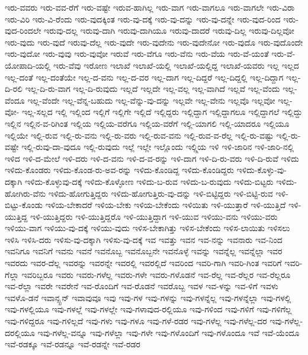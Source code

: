 {ಇರು-ವವರು
ಇರು-ವವ-ರೆಗೆ
ಇರು-ವಷ್ಟೇ
ಇರುವ-ಹಾಗಿಲ್ಲ
ಇರು-ವಾಗ
ಇರು-ವಾಗಲೂ
ಇರು-ವಾಗಲೇ
ಇರು-ವಿರಾ
ಇರು-ವಿರಿ
ಇರು-ವಿ-ರೆಂದು
ಇರು-ವುದಕ್ಕಿಂತ
ಇರು-ವು-ದಕ್ಕೆ
ಇರು-ವು-ದನ್ನು
ಇರು-ವು-ದನ್ನೇ
ಇರು-ವುದ-ರಿಂದ
ಇರು-ವುದ-ರಿಂದಲೇ
ಇರುವು-ದಲ್ಲ
ಇರುವು-ದಾಗಿ
ಇರುವು-ದಾಗಿಯೂ
ಇರುವು-ದಾದರೆ
ಇರುವು-ದಿಲ್ಲ
ಇರುವು-ದಿಲ್ಲವೋ
ಇರು-ವುದು
ಇರು-ವುದೆ
ಇರುವು-ದೆಲ್ಲ
ಇರು-ವುದೇ
ಇರು-ವುದೇನು
ಇರು-ವುದೇನೋ
ಇರು-ವುದೊ
ಇರು-ವುದೊಂದೇ
ಇರು-ವುದೋ
ಇರು-ವುವು
ಇರು-ವುವೋ
ಇರುವೆ
ಇರು-ವೆಗೂ
ಇರು-ವೆನು
ಇರು-ವೆಯ
ಇರು-ವೆ-ಯಂತೆ
ಇರು-ವೆ-ಯೋಪಾದಿ-ಯಲ್ಲಿ
ಇರು-ವೆವು
ಇರೋಣ
ಇಲಾಖೆ
ಇಲಾಖೆ-ಯಲ್ಲಿ
ಇಲಾಖೆ-ಯಲ್ಲಿದ್ದ
ಇಲಾಖೆ-ಯವರು
ಇಲ್ಲ
ಇಲ್ಲದ
ಇಲ್ಲ-ದಂತೆ
ಇಲ್ಲ-ದಂತೆಯೇ
ಇಲ್ಲ-ದ-ವನು
ಇಲ್ಲ-ದ-ವರ
ಇಲ್ಲ-ದಾಗ
ಇಲ್ಲ-ದಿದ್ದರೆ
ಇಲ್ಲ-ದಿದ್ದಲ್ಲಿ
ಇಲ್ಲ-ದಿದ್ದಾಗ
ಇಲ್ಲ-ದಿ-ರಲಿ
ಇಲ್ಲ-ದಿ-ರು-ವಾಗ
ಇಲ್ಲ-ದಿ-ರುವುದು
ಇಲ್ಲದೆ
ಇಲ್ಲದೇ
ಇಲ್ಲ-ವಲ್ಲ
ಇಲ್ಲ-ವಾಗಿದೆ
ಇಲ್ಲವೆ
ಇಲ್ಲ-ವೆಂದು
ಇಲ್ಲ-ವೆಂದೂ
ಇಲ್ಲ-ವೆಂದೇ
ಇಲ್ಲ-ವೆನ್ನ-ಬಹುದು
ಇಲ್ಲ-ವೆನ್ನು-ವು-ದನ್ನು
ಇಲ್ಲವೇ
ಇಲ್ಲ-ವೇನು
ಇಲ್ಲವೊ
ಇಲ್ಲವೋ
ಇಲ್ಲ-ವೋ-
ಇಲ್ಲ-ಸಲ್ಲದ
ಇಲ್ಲಿ
ಇಲ್ಲಿಂದ
ಇಲ್ಲಿಗೆ
ಇಲ್ಲಿಗೇ
ಇಲ್ಲಿದೆ
ಇಲ್ಲಿದ್ದರು
ಇಲ್ಲಿದ್ದಾಗ
ಇಲ್ಲಿದ್ದಾಗಲೂ
ಇಲ್ಲಿದ್ದಾಗಲೆ
ಇಲ್ಲಿದ್ದು
ಇಲ್ಲಿನ
ಇಲ್ಲಿನ-ವ-ರಿಗಿಂತ
ಇಲ್ಲಿಯ
ಇಲ್ಲಿಯ-ವರೆಗೂ
ಇಲ್ಲಿಯ-ವರೆಗೆ
ಇಲ್ಲಿ-ಯಾಗಲಿ
ಇಲ್ಲಿ-ಯಾದರೂ
ಇಲ್ಲಿಯೂ
ಇಲ್ಲಿಯೇ
ಇಲ್ಲಿ-ರುವ
ಇಲ್ಲಿ-ರು-ವನು
ಇಲ್ಲಿ-ರು-ವರು
ಇಲ್ಲಿ-ರುವ-ವನು
ಇಲ್ಲಿ-ರುವ-ವ-ರೆಲ್ಲ
ಇಲ್ಲಿ-ರು-ವಷ್ಟು
ಇಲ್ಲಿ-ರು-ವಷ್ಟೇ
ಇಲ್ಲಿ-ರುವು-ದಾ-ವುದೂ
ಇಲ್ಲಿ-ರುವುದು
ಇಲ್ಲೆ
ಇಲ್ಲೇ
ಇಲ್ಲೊಂದು
ಇಲ್ಲ್ಲಿಯ
ಇಳಿ
ಇಳಿ-ಜಾರಿನ
ಇಳಿ-ಜಾರಿ-ನಲ್ಲಿ
ಇಳಿದ
ಇಳಿ-ದ-ಮೇಲೆ
ಇಳಿ-ದರು
ಇಳಿ-ದ-ವನು
ಇಳಿ-ದ-ವ-ರನ್ನು
ಇಳಿ-ದಾಗ
ಇಳಿ-ದಿ-ರು-ವರು
ಇಳಿ-ದಿ-ರುವೆ
ಇಳಿದು
ಇಳಿದು-ಕೊಂಡರು
ಇಳಿದು-ಕೊಂಡ-ರು-ಅವ-ರನ್ನು
ಇಳಿದು-ಕೊಂಡಿದ್ದ
ಇಳಿದು-ಕೊಂಡಿದ್ದರು
ಇಳಿದು-ಕೊಳ್ಳು-ವು-ದಕ್ಕಾಗಿ
ಇಳಿದು-ಕೊಳ್ಳುವು-ದಕ್ಕೆ
ಇಳಿದು-ಕೊಳ್ಳೋಣ
ಇಳಿದು-ಬ-ರುವ
ಇಳಿದು-ಬ-ರುವುದು
ಇಳಿದು-ಬಿಟ್ಟರು
ಇಳಿದು-ಹೋಗಿರು-ವೆನು
ಇಳಿದು-ಹೋಗುತ್ತಿದ್ದರು
ಇಳಿದು-ಹೋಗುತ್ತಿರು-ವು-ದನ್ನು
ಇಳಿ-ಬಿಟ್ಟಿದ್ದರು
ಇಳಿ-ಬಿಟ್ಟಿ-ರುವ
ಇಳಿ-ಬಿಟ್ಟು-ಕೊಂಡು
ಇಳಿಯ-ಬೇಕಾದರೆ
ಇಳಿಯ-ಬೇಕು
ಇಳಿಯ-ಬೇಕೆಂದು
ಇಳಿಯಿತು
ಇಳಿ-ಯುತ್ತಾರೆ
ಇಳಿ-ಯುತ್ತಿದೆ
ಇಳಿ-ಯುತ್ತಿದ್ದ
ಇಳಿ-ಯುತ್ತಿದ್ದರು
ಇಳಿ-ಯುತ್ತಿದ್ದರೊ
ಇಳಿ-ಯುತ್ತಿದ್ದಾಗ
ಇಳಿ-ಯುವ
ಇಳಿಯು-ವನು
ಇಳಿಯು-ವರು
ಇಳಿಯು-ವಾಗ
ಇಳಿಯು-ವು-ದಕ್ಕೆ
ಇಳಿಯು-ವುದು
ಇಳಿಸ-ಬೇಕಾಗಿತ್ತು
ಇಳಿಸ-ಬೇಕೆಂದು
ಇಳಿಸ-ಲಾಯಿತು
ಇಳಿಸಲು
ಇಳಿಸಿ
ಇಳಿಸಿ-ದರು
ಇಳಿಸು-ವು-ದಕ್ಕಾಗಿ
ಇಳಿಸು-ವು-ದಕ್ಕೆ
ಇವ
ಇವತ್ತು
ಇವನ
ಇವ-ನನ್ನು
ಇವನಾರು
ಇವ-ನಿಂದ
ಇವನಿಗೂ
ಇವನಿಗೆ
ಇವನು
ಇವನೆ
ಇವನೊಬ್ಬ
ಇವನೊಬ್ಬನೇ
ಇವನೊಳ್ಳೆ
ಇವನ್ನು
ಇವನ್ನೆಲ್ಲ
ಇವನ್ನೆಲ್ಲಾ
ಇವರ
ಇವರದು
ಇವರ-ದೆಲ್ಲ
ಇವರನ್ನು
ಇವರನ್ನೇ
ಇವರಲ್ಲಿ
ಇವರಲ್ಲಿದೆ
ಇವರಿಂದ
ಇವರಿ-ಗಾಗಿ
ಇವರಿ-ಗಿಂತ
ಇವರಿಗೆ
ಇವರಿ-ಗೆಲ್ಲಾ
ಇವರಿಬ್ಬರೂ
ಇವರು
ಇವರು-ಗಳೆಲ್ಲ
ಇವರು-ಗಳೇ
ಇವರು-ಗಳೊಡನೆ
ಇವ-ರೆಲ್ಲ
ಇವ-ರೆಲ್ಲರ
ಇವ-ರೆಲ್ಲರೂ
ಇವ-ರೆಲ್ಲಾ
ಇವರೇ
ಇವರೇನೆ
ಇವ-ರೊಂದಿಗೆ
ಇವ-ರೊಡನೆ
ಇವರೊಬ್ಬ
ಇವಳ
ಇವ-ಳನ್ನು
ಇವ-ಳಿಗೆ
ಇವಳು
ಇವಳೊ-ಡನೆ
ಇವಾನ್ಸ್ಟನ್
ಇವಾವುವೂ
ಇವು
ಇವು-ಗಳ
ಇವು-ಗಳನ್ನು
ಇವು-ಗಳನ್ನೆಲ್ಲ
ಇವು-ಗಳನ್ನೆಲ್ಲಾ
ಇವು-ಗಳಲ್ಲಿ
ಇವು-ಗಳಲ್ಲಿಯೂ
ಇವು-ಗಳಲ್ಲೆ
ಇವು-ಗಳಲ್ಲೇ
ಇವು-ಗಳಾವುದ-ರಲ್ಲಿಯೂ
ಇವು-ಗಳಿಂದ
ಇವು-ಗಳಿಗೆ
ಇವು-ಗಳಿಗೆಲ್ಲ
ಇವು-ಗಳಿದ್ದರೂ
ಇವು-ಗಳಿಲ್ಲದೆ
ಇವು-ಗಳು
ಇವು-ಗಳೂ
ಇವು-ಗಳೆ-ರಡರ
ಇವು-ಗಳೆಲ್ಲ
ಇವು-ಗಳೆಲ್ಲ-ದರ
ಇವು-ಗಳೆಲ್ಲ-ದರಲ್ಲಿಯೂ
ಇವು-ಗಳೆಲ್ಲ-ವನ್ನೂ
ಇವು-ಗಳೆಲ್ಲಾ
ಇವು-ಗಳೇ
ಇವು-ಗಳೊಂದಿಗೆ
ಇವು-ಗಳೊಂದೂ
ಇವೆ
ಇವೆ-ಯೆಂದೂ
ಇವೆ-ರಡಕ್ಕೂ
ಇವೆ-ರಡನ್ನೂ
ಇವೆ-ರಡನ್ನೇ
ಇವೆ-ರಡರ
}
